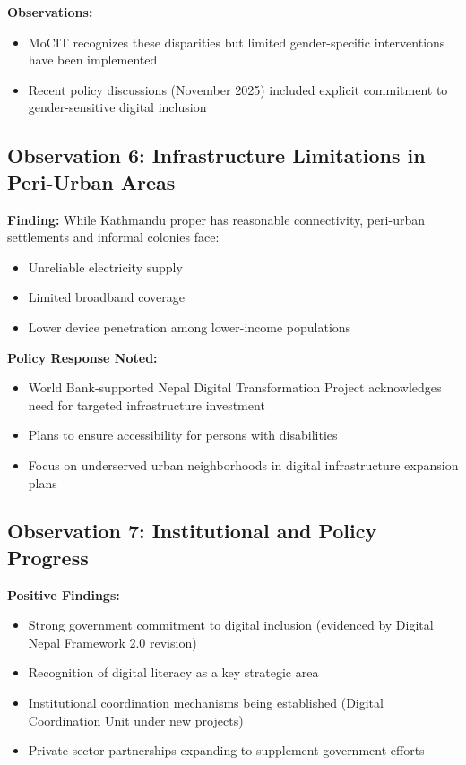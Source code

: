 \documentclass[12pt,a4paper]{article}
\begin{document}
\textbf{Observations:}
\begin{itemize}
    \item MoCIT recognizes these disparities but limited gender-specific interventions have been implemented
    \item Recent policy discussions (November 2025) included explicit commitment to gender-sensitive digital inclusion
\end{itemize}

\subsection{Observation 6: Infrastructure Limitations in Peri-Urban Areas}

\textbf{Finding:} While Kathmandu proper has reasonable connectivity, peri-urban settlements and informal colonies face:
\begin{itemize}
    \item Unreliable electricity supply
    \item Limited broadband coverage
    \item Lower device penetration among lower-income populations
\end{itemize}

\textbf{Policy Response Noted:}
\begin{itemize}
    \item World Bank-supported Nepal Digital Transformation Project acknowledges need for targeted infrastructure investment
    \item Plans to ensure accessibility for persons with disabilities
    \item Focus on underserved urban neighborhoods in digital infrastructure expansion plans
\end{itemize}

\subsection{Observation 7: Institutional and Policy Progress}

\textbf{Positive Findings:}
\begin{itemize}
    \item Strong government commitment to digital inclusion (evidenced by Digital Nepal Framework 2.0 revision)
    \item Recognition of digital literacy as a key strategic area
    \item Institutional coordination mechanisms being established (Digital Coordination Unit under new projects)
    \item Private-sector partnerships expanding to supplement government efforts
\end{itemize}
\end{document}
